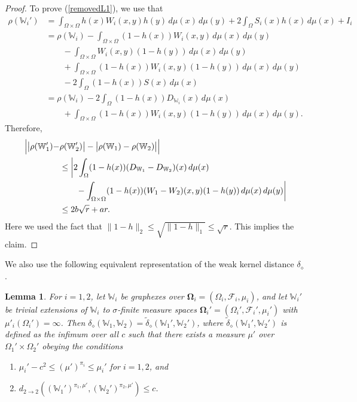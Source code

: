 \documentclass{amsart}
\numberwithin{equation}{section}
\numberwithin{figure}{section}
\newtheorem{lemma}[theorem]{Lemma}
\theoremstyle{definition}
\theoremstyle{remark}
\newcommand{\bOmega}{{\mathbf{\Omega}}}
\newcommand{\cW}{\mathbb{W}}
\newcommand{\cF}{\mathcal{F}}
\def\d22{d_{2\to 2}}
\def\delGP{\delta_\diamond}
\def\tdelGP{\widetilde\delta_\diamond}
\begin{document}
\begin{proof}
To prove (\ref{removedL1}), we use that
\begin{align*}
\rho(\cW_i') &= \int_{\Omega \times \Omega} h(x) W_i(x,y) h(y) \,d\mu(x) \,d\mu(y) + 2 \int_{\Omega} S_i(x) h(x) \,d\mu(x) + I_i\\
&= \rho(\cW_i) -\int_{\Omega \times \Omega} (1-h(x)) W_i(x,y) \,d\mu(x) \,d\mu(y)\\
& \qquad \phantom{} - \int_{\Omega \times \Omega} W_i(x,y) (1-h(y)) \,d\mu(x) \,d\mu(y)\\
& \qquad \phantom{}+\int_{\Omega \times \Omega} (1-h(x)) W_i(x,y) (1-h(y)) \,d\mu(x) \,d\mu(y)\\
& \qquad \phantom{}- 2\int_{\Omega} (1-h(x))S(x) \,d\mu(x)\\
&=\rho(\cW_i) - 2 \int_\Omega (1-h(x))D_{\cW_i}(x) \,d\mu(x)\\
& \qquad \phantom{}+\int_{\Omega \times \Omega} (1-h(x)) W_i(x,y) (1-h(y)) \,d\mu(x) \,d\mu(y).
\end{align*}
Therefore,
\begin{align*}
\Bigl|\bigl|\rho(\cW'_1)-&\rho(\cW'_2)\bigr|-\bigl|\rho(\cW_1)-\rho(\cW_2)\bigr|\Bigr|\\
&\le \biggl|2\int_{\Omega} (1-h(x))(D_{\cW_1}-D_{\cW_2})(x) \,d\mu(x)\biggr.\\
&\qquad
-
\biggl.\int_{\Omega \times \Omega}(1-h(x))(W_1-W_2)(x,y)(1-h(y))\,d\mu(x)\,d\mu(y) \biggr|\\
&\le 2b\sqrt{r}+ ar.
\end{align*}
Here we used the fact that $\|1-h\|_2 \le \sqrt{\|1-h\|_1} \le \sqrt{r}$.
This implies the claim.
\end{proof}

We also use the following equivalent representation of the weak kernel
distance $\delGP$.

\begin{lemma}\label{lem:tilde-delGP}
For $i=1,2$, let $\cW_i$ be graphexes over
$\bOmega_i=(\Omega_i,\cF_i,\mu_i)$, and let $\cW_i'$ be trivial extensions of
$\cW_i$ to $\sigma$-finite measure spaces
$\bOmega_i'=(\Omega_i',\cF_i',\mu_i')$ with $\mu'_i(\Omega_i')=\infty$. Then
$\delGP(\cW_1,\cW_2)=\tdelGP(\cW_1',\cW_2')$, where $\tdelGP(\cW_1',\cW_2')$
is defined as the infimum over all $c$ such that there exists a measure
$\mu'$ over $\Omega_1'\times\Omega_2'$ obeying the conditions
\begin{enumerate}
\item[(1)] $\mu_i'-c^2\leq(\mu')^{\pi_i}\leq\mu_i'$ for $i=1,2$, and
\item[(2)] $\d22((\cW_1')^{\pi_1,\mu'},(\cW_2')^{\pi_2,\mu'})\leq c$.
\end{enumerate}
\end{lemma}
\end{document}
